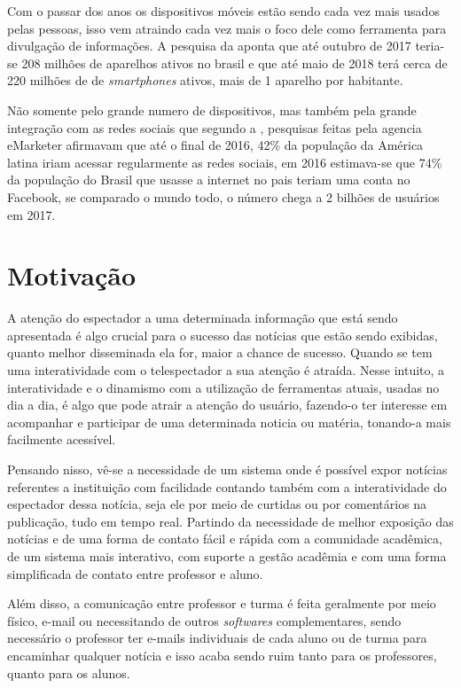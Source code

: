 Com o passar dos anos os dispositivos móveis estão sendo cada vez mais usados pelas pessoas, isso vem atraindo cada vez mais o foco dele como ferramenta para divulgação de informações. A pesquisa da \cite{fgv2017} aponta que até outubro de 2017 teria-se 208 milhões de aparelhos ativos no brasil e que até maio de 2018 terá cerca de 220 milhões de de \textit{smartphones} ativos, mais de 1 aparelho por habitante. 

Não somente pelo grande numero de dispositivos, mas também pela grande integração com as redes sociais que segundo a \cite{forbes2016}, pesquisas feitas pela agencia eMarketer afirmavam que até o final de 2016, 42\% da população da América latina iriam acessar regularmente as redes sociais, em 2016 estimava-se que 74\% da população do Brasil que usasse a internet no pais teriam uma conta no Facebook, se comparado o mundo todo, o número chega a 2 bilhões de usuários em 2017. 


\section{Motivação}
A atenção do espectador a uma determinada informação que está sendo apresentada é algo crucial para o sucesso das notícias que estão sendo exibidas, quanto melhor disseminada ela for, maior a chance de sucesso. Quando se tem uma interatividade com o telespectador a sua atenção é atraída. Nesse intuito, a interatividade e o dinamismo com a utilização de ferramentas atuais, usadas no dia a dia, é algo que pode atrair a atenção do usuário, fazendo-o ter interesse em acompanhar e participar de uma determinada noticia ou matéria, tonando-a mais facilmente acessível. 

Pensando nisso, vê-se a necessidade de um sistema onde é possível expor notícias referentes a instituição com facilidade contando também com a interatividade do espectador dessa notícia, seja ele por meio de curtidas ou por comentários na publicação, tudo em tempo real. Partindo da necessidade de melhor exposição das notícias e de uma forma de contato fácil e rápida com a comunidade acadêmica, de um sistema mais interativo, com suporte a gestão acadêmia e com uma forma simplificada de contato entre professor e aluno. 

Além disso, a comunicação entre professor e turma é feita geralmente por meio físico, e-mail ou necessitando de outros \textit{softwares} complementares, sendo necessário o professor ter e-mails individuais de cada aluno ou de turma para encaminhar qualquer notícia e isso acaba sendo ruim tanto para os professores, quanto para os alunos. 

